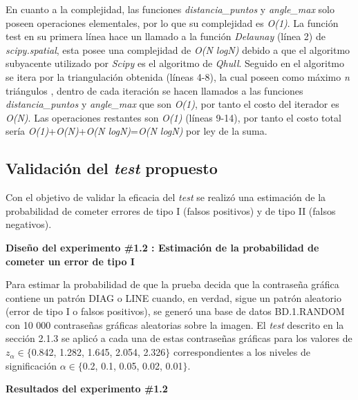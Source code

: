 \documentclass[12pt]{report}
\begin{document}
En cuanto a la complejidad, las funciones \textit{distancia\_puntos} y \textit{angle\_max} solo poseen operaciones elementales, por lo que su complejidad es \textit{O(1)}. La función test en su primera línea hace un llamado a la función  \textit{Delaunay} (línea 2) de \textit{scipy.spatial}, esta posee una complejidad de \textit{O(N logN)} debido a que el algoritmo subyacente utilizado por \textit{Scipy} es el algoritmo de \textit{Qhull}. Seguido en el algoritmo se itera por la triangulación obtenida (líneas 4-8), la cual poseen como máximo \textit{n} triángulos , dentro de cada iteración se hacen llamados a las  funciones \textit{distancia\_puntos} y \textit{angle\_max}  que son \textit{O(1)}, por tanto el costo del iterador es \textit{O(N)}. Las operaciones restantes son \textit{O(1)} (líneas 9-14), por tanto el costo total sería \textit{O(1)}+\textit{O(N)}+\textit{O(N logN)}=\textit{O(N logN)} por ley de la suma.
\subsection{Validación del \textit{test} propuesto}
	
	Con el objetivo de validar la eficacia del \textit{test} se realizó una estimación de la probabilidad de cometer errores de tipo I (falsos positivos) y de tipo II (falsos negativos).
		 
	\textbf{Diseño del experimento \#1.2 : Estimación de la probabilidad de cometer un error de tipo I} 
	
	Para estimar la probabilidad de que la prueba decida que la contraseña gráfica contiene un patrón DIAG o LINE cuando, en verdad, sigue un patrón aleatorio (error de tipo I o falsos positivos), se generó una base de datos BD.1.RANDOM con 10 000 contraseñas gráficas aleatorias sobre la imagen. El \textit{test} descrito en la sección 2.1.3 se aplicó a cada una de estas contraseñas gráficas para los valores de $z_\alpha \in \{$0.842, 1.282, 1.645, 2.054, 2.326$\}$ correspondientes a los niveles de significación $\alpha \in \{$0.2, 0.1, 0.05, 0.02, 0.01$\}$.
	


\textbf{Resultados del experimento \#1.2}
\end{document}
